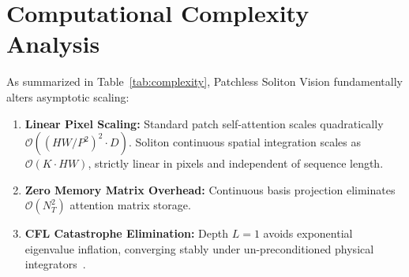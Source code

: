 \documentclass[10pt,twocolumn]{article}
\begin{document}
\section{Computational Complexity Analysis}

\begin{table}[h!]
\centering
\small
\renewcommand{\arraystretch}{1.1}
\caption{\textbf{Asymptotic Complexity: ViT vs.\ Patchless Soliton Vision.}}
\vspace{2mm}
\label{tab:complexity}
\end{table}

As summarized in Table~\ref{tab:complexity}, Patchless Soliton Vision fundamentally alters asymptotic scaling:
\begin{enumerate}
    \item \textbf{Linear Pixel Scaling:} Standard patch self-attention scales quadratically $\mathcal{O}((HW/P^2)^2 \cdot D)$. Soliton continuous spatial integration scales as $\mathcal{O}(K \cdot H W)$, strictly linear in pixels and independent of sequence length.
    \item \textbf{Zero Memory Matrix Overhead:} Continuous basis projection eliminates $\mathcal{O}(N_T^2)$ attention matrix storage.
    \item \textbf{CFL Catastrophe Elimination:} Depth $L=1$ avoids exponential eigenvalue inflation, converging stably under un-preconditioned physical integrators~\cite{barmase2026variational}.
\end{enumerate}
\end{document}
